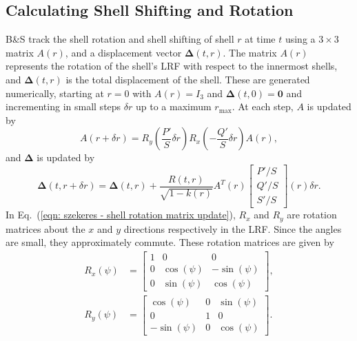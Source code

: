 \documentclass[a4paper,12pt]{report}
\renewcommand{\vec}[1]{\ensuremath{\bm{#1}}}
\renewcommand{\eqref}[1]{Eq.~({#1})}
\begin{document}
\subsection{Calculating Shell Shifting and Rotation}
B\&S track the shell rotation and shell shifting of shell $r$ at time $t$ using a $3 \times 3$ matrix $A(r)$, and a displacement vector $\bm{\Delta}(t,r)$. The matrix $A(r)$ represents the rotation of the shell's LRF with respect to the innermost shells, and $\bm{\Delta}(t,r)$ is the total displacement of the shell. These are generated numerically, starting at $r=0$ with $A(r)=I_3$ and $\bm{\Delta}(t,0)=\vec{0}$ and incrementing in small steps $\delta r$ up to a maximum $r_\text{max}$. At each step, $A$ is updated by
\begin{equation} \label{eqn: szekeres - shell rotation matrix update}
  A(r+\delta r) = R_y\left(\frac{P'}{S}\delta r\right)R_x\left(-\frac{Q'}{S}\delta r\right)A(r),
\end{equation}
and $\bm{\Delta}$ is updated by
\begin{equation} \label{eqn: szekeres - shell shift vector update}
  \bm{\Delta}(t,r+\delta r) = \bm{\Delta}(t,r) + \frac{R(t,r)}{\sqrt{1-k(r)}}A^T(r)\begin{bmatrix}
    P'/S \\ Q'/S \\ S'/S
\end{bmatrix}(r) \delta r.
\end{equation}
In \eqref{\ref{eqn: szekeres - shell rotation matrix update}}, $R_x$ and $R_y$ are rotation matrices about the $x$ and $y$ directions respectively in the LRF. Since the angles are small, they approximately commute. These rotation matrices are given by
\begin{subequations}
\begin{align}
  R_x(\psi) &=
  \begin{bmatrix}
    1 & 0 & 0\\
    0 & \cos(\psi) & -\sin(\psi)\\
    0 & \sin(\psi) & \cos(\psi)
    \end{bmatrix},\\
  R_y(\psi) &=
  \begin{bmatrix}
    \cos(\psi) & 0 & \sin(\psi)\\
    0 & 1 & 0\\
    -\sin(\psi) & 0 & \cos(\psi)
  \end{bmatrix}.
\end{align}
\end{subequations}
\end{document}
